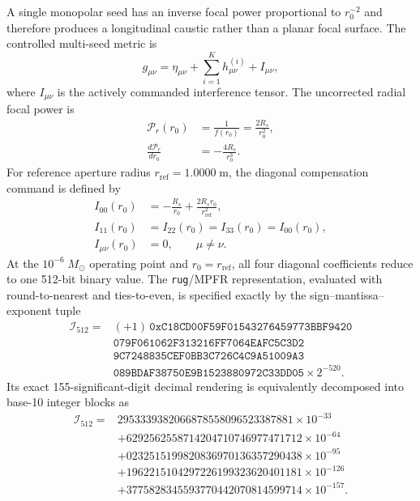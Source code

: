 \documentclass[10pt,twocolumn]{IEEEtran}
\newcommand{\Msun}{M_{\odot}}
\begin{document}
A single monopolar seed has an inverse focal power proportional to $r_0^{-2}$ and therefore produces a longitudinal caustic rather than a planar focal surface. The controlled multi-seed metric is
\begin{equation}
g_{\mu\nu}=\eta_{\mu\nu}
+\sum_{i=1}^{K}h_{\mu\nu}^{(i)}+I_{\mu\nu},
\label{eq:multiseed_metric}
\end{equation}
where $I_{\mu\nu}$ is the actively commanded interference tensor. The uncorrected radial focal power is
\begin{equation}
\begin{aligned}
\mathcal P_r(r_0)&=\frac{1}{f(r_0)}
=\frac{2R_s}{r_0^2}, \\
\frac{d\mathcal P_r}{dr_0}&=-\frac{4R_s}{r_0^3}.
\end{aligned}
\label{eq:radial_focal_power}
\end{equation}
For reference aperture radius $r_{\mathrm{ref}}=1.0000\;\mathrm{m}$, the diagonal compensation command is defined by
\begin{equation}
\begin{aligned}
I_{00}(r_0)&=-\frac{R_s}{r_0}
+\frac{2R_s r_0}{r_{\mathrm{ref}}^2}, \\
I_{11}(r_0)&=I_{22}(r_0)=I_{33}(r_0)=I_{00}(r_0), \\
I_{\mu\nu}(r_0)&=0,
\qquad \mu\neq\nu.
\end{aligned}
\label{eq:interference_tensor_profile}
\end{equation}
At the $10^{-6}\;\Msun$ operating point and $r_0=r_{\mathrm{ref}}$, all four diagonal coefficients reduce to one 512-bit binary value. The \texttt{rug}/MPFR representation, evaluated with round-to-nearest and ties-to-even, is specified exactly by the sign--mantissa--exponent tuple
\begin{equation}
\begin{aligned}
\mathcal I_{512}={}&(+1)\,\mathtt{0xC18CD00F59F01543276459773BBF9420}\\
&\mathtt{079F061062F313216FF7064EAFC5C3D2}\\
&\mathtt{9C7248835CEF0BB3C726C4C9A51009A3}\\
&\mathtt{089BDAF38750E9B1523880972C33DD05}
\times2^{-520}.
\end{aligned}
\label{eq:mpfr_payload}
\end{equation}
Its exact 155-significant-digit decimal rendering is equivalently decomposed into base-10 integer blocks as
\begin{equation}
\begin{aligned}
\mathcal I_{512}={}&2953339382066878558096523387881\times10^{-33}\\
&+6292562558714204710746977471712\times10^{-64}\\
&+0232515199820836970136357290438\times10^{-95}\\
&+1962215104297226199323620401181\times10^{-126}\\
&+3775828345593770442070814599714\times10^{-157}.
\end{aligned}
\label{eq:mpfr_decimal}
\end{equation}
\end{document}
